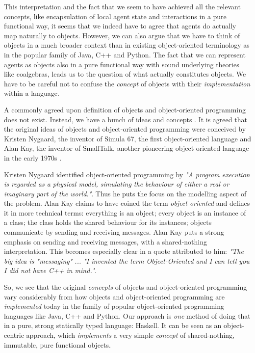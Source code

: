 \medskip

This interpretation and the fact that we seem to have achieved all the relevant concepts, like encapsulation of local agent state and interactions in a pure functional way, it seems that we indeed have to agree that agents do actually map naturally to objects. However, we can also argue that we have to think of objects in a much broader context than in existing object-oriented terminology as in the popular family of Java, C++ and Python. The fact that we can represent agents as objects also in a pure functional way with sound underlying theories like coalgebras, leads us to the question of what actually constitutes objects. We have to be careful not to confuse the \textit{concept} of objects with their \textit{implementation} within a language.

A commonly agreed upon definition of objects and object-oriented programming does not exist. Instead, we have a bunch of ideas and concepts \cite{definitionsforoo}. It is agreed that the original ideas of objects and object-oriented programming were conceived by Kristen Nygaard, the inventor of Simula 67, the first object-oriented language \cite{dahl_birth_2002} and Alan Kay, the inventor of SmallTalk, another pioneering object-oriented language in the early 1970s \cite{kay_early_1993}. %

Kristen Nygaard identified object-oriented programming by \textit{"A program execution is regarded as a physical model, simulating the behaviour of either a real or imaginary part of the world."}. Thus he puts the focus on the modelling aspect of the problem. Alan Kay claims to have coined the term \textit{object-oriented} and defines it in more technical terms: everything is an object; every object is an instance of a class; the class holds the shared behaviour for its instances; objects communicate by sending and receiving messages. Alan Kay puts a strong emphasis on sending and receiving messages, with a shared-nothing interpretation. This becomes especially clear in a quote attributed to him: \textit{"The big idea is "messaging" ... "I invented the term Object-Oriented and I can tell you I did not have C++ in mind."}.

\medskip

So, we see that the original \textit{concepts} of objects and object-oriented programming vary considerably from how objects and object-oriented programming are \textit{implemented} today in the family of popular object-oriented programming languages like Java, C++ and Python.
Our approach is \textit{one} method of doing that in a pure, strong statically typed language: Haskell. It can be seen as an object-centric approach, which \textit{implements} a very simple \textit{concept} of shared-nothing, immutable, pure functional objects.

